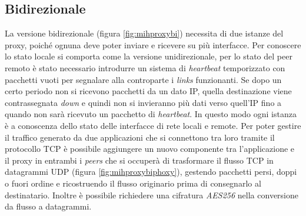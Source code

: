 \subsection{Bidirezionale}
La versione bidirezionale (figura \ref{fig:mihproxybi}) necessita di due istanze del proxy, poiché ognuna deve poter inviare e ricevere su più interfacce. Per conoscere lo stato locale si comporta come la versione unidirezionale, per lo stato del peer remoto è stato necessario introdurre un sistema di {\em heartbeat} temporizzato con pacchetti vuoti per segnalare alla controparte i {\em links} funzionanti. Se dopo un certo periodo non si ricevono pacchetti da un dato IP, quella destinazione viene contrassegnata {\em down} e quindi non si invieranno più dati verso quell'IP fino a quando non sarà ricevuto un pacchetto di {\em heartbeat}. In questo modo ogni istanza è a conoscenza dello stato delle interfacce di rete locali e remote. Per poter gestire il traffico generato da due applicazioni che si connettono tra loro tramite il protocollo TCP è possibile aggiungere un nuovo componente tra l'applicazione e il proxy in entrambi i {\em peers} che si occuperà di trasformare il flusso TCP in datagrammi UDP (figura \ref{fig:mihproxybiphoxy}), gestendo pacchetti persi, doppi o fuori ordine e ricostruendo il flusso originario prima di consegnarlo al destinatario. Inoltre è possibile richiedere una cifratura {\em AES256} nella conversione da flusso a datagrammi.\\
